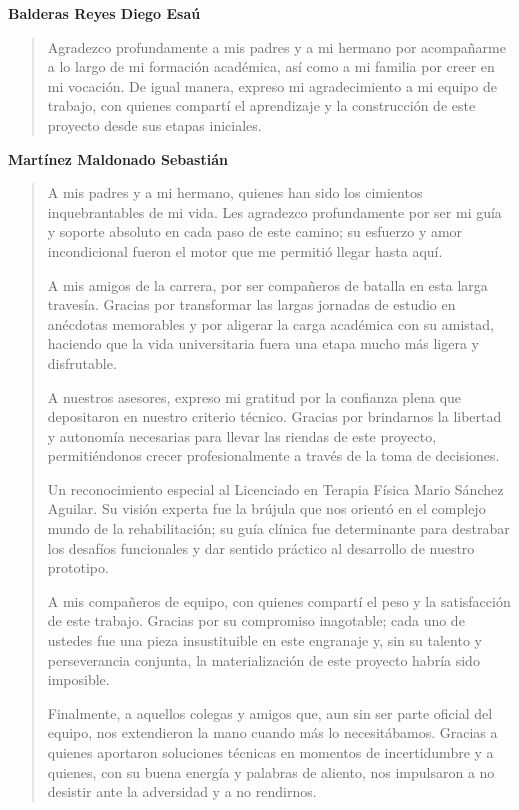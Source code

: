 
\noindent \textbf{Balderas Reyes Diego Esaú}
\begin{quote}
Agradezco profundamente a mis padres y a mi hermano por acompañarme a lo largo de mi formación académica, así como a mi familia por creer en mi vocación. De igual manera, expreso mi agradecimiento a mi equipo de trabajo, con quienes compartí el aprendizaje y la construcción de este proyecto desde sus etapas iniciales.
\end{quote}
\vspace{0.5cm}
\noindent \textbf{Martínez Maldonado Sebastián}
\begin{quote}
    A mis padres y a mi hermano, quienes han sido los cimientos inquebrantables de mi vida. Les agradezco profundamente por ser mi guía y soporte absoluto en cada paso de este camino; su esfuerzo y amor incondicional fueron el motor que me permitió llegar hasta aquí.

    A mis amigos de la carrera, por ser compañeros de batalla en esta larga travesía. Gracias por transformar las largas jornadas de estudio en anécdotas memorables y por aligerar la carga académica con su amistad, haciendo que la vida universitaria fuera una etapa mucho más ligera y disfrutable.

    A nuestros asesores, expreso mi gratitud por la confianza plena que depositaron en nuestro criterio técnico. Gracias por brindarnos la libertad y autonomía necesarias para llevar las riendas de este proyecto, permitiéndonos crecer profesionalmente a través de la toma de decisiones.

    Un reconocimiento especial al Licenciado en Terapia Física Mario Sánchez Aguilar. Su visión experta fue la brújula que nos orientó en el complejo mundo de la rehabilitación; su guía clínica fue determinante para destrabar los desafíos funcionales y dar sentido práctico al desarrollo de nuestro prototipo.

    A mis compañeros de equipo, con quienes compartí el peso y la satisfacción de este trabajo. Gracias por su compromiso inagotable; cada uno de ustedes fue una pieza insustituible en este engranaje y, sin su talento y perseverancia conjunta, la materialización de este proyecto habría sido imposible.

    Finalmente, a aquellos colegas y amigos que, aun sin ser parte oficial del equipo, nos extendieron la mano cuando más lo necesitábamos. Gracias a quienes aportaron soluciones técnicas en momentos de incertidumbre y a quienes, con su buena energía y palabras de aliento, nos impulsaron a no desistir ante la adversidad y a no rendirnos.
\end{quote}
\vspace{0.5cm}

